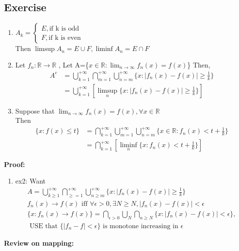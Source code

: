 \subsection{Exercise}
\begin{enumerate}
    \item $A_k=\begin{cases}
        E, \text{if k is odd}
        \\ F, \text{if k is even}
    \end{cases}$
    \\Then $ \limsup{A_n}=E \cup F, \liminf{A_n}=E \cap F$
    \item Let $ f_n:\mathbb{R}\rightarrow\mathbb{R} $ , Let A=\{$x\in\mathbb{R}:\lim_{n\rightarrow\infty}f_n(x)=f(x)$\}
    Then,\begin{align*}
        A^c&=\bigcup_{k=1}^{+\infty}\bigcap_{m=1}^{+\infty}\bigcup_{n=m}^{+\infty}\{x:|f_n(x)-f(x)|\geq\frac{1}{k}\}
      \\  &=\bigcup_{k=1}^{+\infty}[\limsup_{n}\{x:|f_n(x)-f(x)|\geq\frac{1}{k}\}]
  \end{align*}
    \item Suppose that $ \lim_{n\rightarrow\infty}f_n(x)=f(x),\forall x \in \mathbb{R} $ 
    \\Then\begin{align*}
        \{x:f(x)\leq t\}&=\bigcap_{k=1}^{+\infty}\bigcup_{m=1}^{+\infty}\bigcup_{n=m}^{+\infty}\{x\in \mathbb{R}:f_n(x)< t+\frac{1}{k}\}
    \\&=\bigcap_{k=1}^{+\infty}[\liminf_{n}\{x:f_n(x)< t+\frac{1}{k}\}]
    \end{align*}
\end{enumerate}
\textbf{Proof:}
\begin{enumerate}
    \item ex2: Want 
    \begin{align*}
        A=\bigcup_{k\geq1}^{+\infty}\bigcap_{\geq=1}^{+\infty}\bigcup_{n\geq m}^{+\infty}\{x:|f_n(x)-f(x)|\geq\frac{1}{k}\} 
        \\f_n(x)\rightarrow f(x) \text{ iff }\forall \epsilon>0, \exists N \geq N, |f_n(x)-f(x)|<\epsilon
        \\ \{x:f_n(x)\rightarrow f(x)\}=\bigcap_{\epsilon>0}\bigcup_{N}\bigcap_{n\geq N}\{x:|f_n(x)-f(x)|<\epsilon\}, 
        \\ \text{ USE that } \{|f_n-f|<\epsilon\} \text{ is monotone increasing in } \epsilon
    \end{align*} 
\end{enumerate}
\textbf{Review on mapping:}

